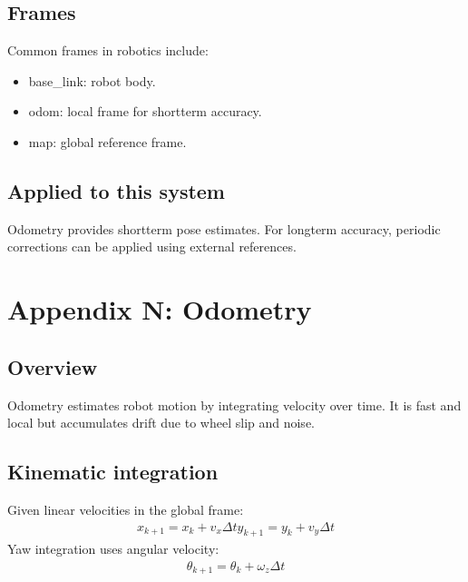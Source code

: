 \documentclass[letterpaper,10pt,english]{sphinxmanual}
\begin{document}
\section{Frames}
\label{\detokenize{appendix_m_localization:frames}}
\sphinxAtStartPar
Common frames in robotics include:
\begin{itemize}
\item {} 
\sphinxAtStartPar
base\_link: robot body.

\item {} 
\sphinxAtStartPar
odom: local frame for short\sphinxhyphen{}term accuracy.

\item {} 
\sphinxAtStartPar
map: global reference frame.

\end{itemize}


\section{Applied to this system}
\label{\detokenize{appendix_m_localization:applied-to-this-system}}
\sphinxAtStartPar
Odometry provides short\sphinxhyphen{}term pose estimates. For long\sphinxhyphen{}term accuracy, periodic
corrections can be applied using external references.


\chapter{Appendix N: Odometry}
\label{\detokenize{appendix_n_odometry:appendix-n-odometry}}\label{\detokenize{appendix_n_odometry::doc}}

\section{Overview}
\label{\detokenize{appendix_n_odometry:overview}}
\sphinxAtStartPar
Odometry estimates robot motion by integrating velocity over time. It is fast
and local but accumulates drift due to wheel slip and noise.


\section{Kinematic integration}
\label{\detokenize{appendix_n_odometry:kinematic-integration}}
\sphinxAtStartPar
Given linear velocities in the global frame:
\begin{equation*}
\begin{split}x_{k+1} = x_k + v_x \Delta t
y_{k+1} = y_k + v_y \Delta t\end{split}
\end{equation*}
\sphinxAtStartPar
Yaw integration uses angular velocity:
\begin{equation*}
\begin{split}\theta_{k+1} = \theta_k + \omega_z \Delta t\end{split}
\end{equation*}
\end{document}
